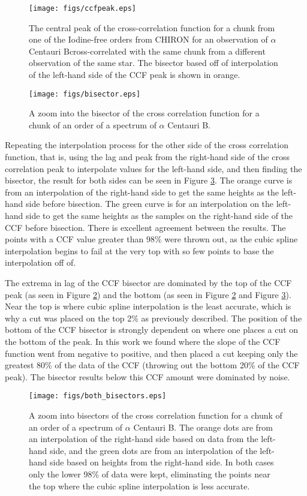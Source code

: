 \documentclass[iop]{emulateapj}
\def\acenb{$\alpha$ Centauri B}
\begin{document}
\begin{figure}[ht]
\texttt{[image: figs/ccfpeak.eps]}
\caption{\label{fig:ccfpeak} The central peak of the cross-correlation function for a chunk from one of the Iodine-free orders from CHIRON for an observation of \acenb cross-correlated with the same chunk from a different observation of the same star. The bisector based off of interpolation of the left-hand side of the CCF peak is shown in orange.}
\end{figure}

\begin{figure}[ht]
\texttt{[image: figs/bisector.eps]}
\caption{\label{fig:bisector} A zoom into the bisector of the cross correlation function for a chunk of an order of a spectrum of \acenb.}
\end{figure}

Repeating the interpolation process for the other side of the cross correlation function, that is, using the lag and peak from the right-hand side of the cross correlation peak to interpolate values for the left-hand side, and then finding the bisector, the result for both sides can be seen in Figure \ref{fig:both_bisectors}. The orange curve is from an interpolation of the right-hand side to get the same heights as the left-hand side before bisection. The green curve is for an interpolation on the left-hand side to get the same heights as the samples on the right-hand side of the CCF before bisection. There is excellent agreement between the results. The points with a CCF value greater than 98\% were thrown out, as the cubic spline interpolation begins to fail at the very top with so few points to base the interpolation off of.

The extrema in lag of the CCF bisector are dominated by the top of the CCF peak (as seen in Figure \ref{fig:bisector}) and the bottom (as seen in Figure \ref{fig:bisector} and Figure \ref{fig:both_bisectors}). Near the top is where cubic spline interpolation is the least accurate, which is why a cut was placed on the top 2\% as previously described. The position of the bottom of the CCF bisector is strongly dependent on where one places a cut on the bottom of the peak. In this work we found where the slope of the CCF function went from negative to positive, and then placed a cut keeping only the greatest 80\% of the data of the CCF (throwing out the bottom 20\% of the CCF peak). The bisector results below this CCF amount were dominated by noise.

\begin{figure}[ht]
\texttt{[image: figs/both\_bisectors.eps]}
\caption{\label{fig:both_bisectors} A zoom into bisectors of the cross correlation function for a chunk of an order of a spectrum of \acenb. The orange dots are from an interpolation of the right-hand side based on data from the left-hand side, and the green dots are from an interpolation of the left-hand side based on heights from the right-hand side. In both cases only the lower 98\% of data were kept, eliminating the points near the top where the cubic spline interpolation is less accurate. }
\end{figure}
\end{document}

